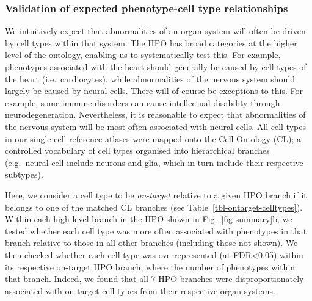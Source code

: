 \documentclass[
]{article}
\begin{document}
\subsubsection{Validation of expected phenotype-cell type
relationships}\label{validation-of-expected-phenotype-cell-type-relationships}

We intuitively expect that abnormalities of an organ system will often
be driven by cell types within that system. The HPO has broad categories
at the higher level of the ontology, enabling us to systematically test
this. For example, phenotypes associated with the heart should generally
be caused by cell types of the heart (i.e.~cardiocytes), while
abnormalities of the nervous system should largely be caused by neural
cells. There will of course be exceptions to this. For example, some
immune disorders can cause intellectual disability through
neurodegeneration. Nevertheless, it is reasonable to expect that
abnormalities of the nervous system will be most often associated with
neural cells. All cell types in our single-cell reference atlases were
mapped onto the Cell Ontology (CL); a controlled vocabulary of cell
types organised into hierarchical branches (e.g.~neural cell include
neurons and glia, which in turn include their respective subtypes).

Here, we consider a cell type to be \emph{on-target} relative to a given
HPO branch if it belongs to one of the matched CL branches (see
Table~\ref{tbl-ontarget-celltypes}). Within each high-level branch in
the HPO shown in Fig.~\ref{fig-summary}b, we tested whether each cell
type was more often associated with phenotypes in that branch relative
to those in all other branches (including those not shown). We then
checked whether each cell type was overrepresented (at FDR\textless0.05)
within its respective on-target HPO branch, where the number of
phenotypes within that branch. Indeed, we found that all 7 HPO branches
were disproportionately associated with on-target cell types from their
respective organ systems.

\newpage{}
\end{document}
